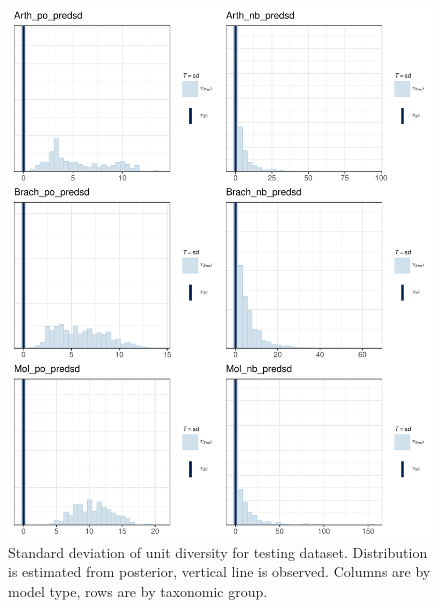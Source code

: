 \documentclass[12pt,letterpaper]{article}
\begin{document}
\begin{figure}[h]
\afterpage{\clearpage}
  \centering
  \includegraphics[width=\textwidth,height=0.8\textheight,keepaspectratio=true]{figure/pred_sd}
  \caption{Standard deviation of unit diversity for testing dataset. Distribution is estimated from posterior, vertical line is observed. Columns are by model type, rows are by taxonomic group.}
  \label{fig:pred_sd}
\end{figure}
\end{document}
